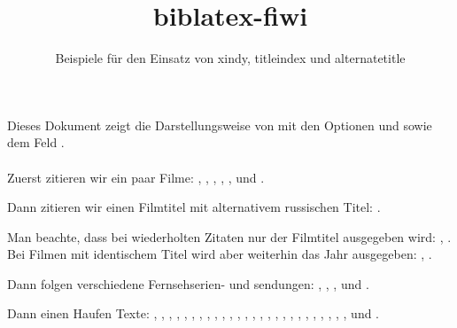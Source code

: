 \documentclass[a4paper]{scrartcl}
\begin{document}
\title{biblatex-fiwi}\subtitle{Beispiele für den Einsatz von xindy, titleindex und alternatetitle}\date{}\maketitle
\noindent Dieses Dokument zeigt die Darstellungsweise von  mit den Optionen  und  sowie dem Feld .\\ \\

\noindent Zuerst zitieren wir ein paar Filme: , , , , ,  und .

Dann zitieren wir einen Filmtitel mit alternativem russischen Titel: .

Man beachte, dass bei wiederholten Zitaten nur der Filmtitel ausgegeben wird: , . Bei Filmen mit identischem Titel wird aber weiterhin das Jahr ausgegeben: , .

Dann folgen verschiedene Fernsehserien- und sendungen: , , ,  und .

Dann einen Haufen Texte: \textcite{sklovskij.v:1969a} \textcite{Spiegel.S:2010c}, \textcite{Muller.A:2010a}, \textcite{Wells.H:1908}, \textcite{Spiegel.S:2007b}, \textcite{Lukian.1981}, \textcite{Kepler.J:1993}, , \textcite{vonMatt.P:2002}, \textcite{Keitz.U:2004a}, \textcite{Wells.HG:1980}, \textcite{Ackerman.Strickland:1981}, \textcite{Anderson.P:1971a}, \textcite{Gaudreault.A:1993}, \textcite{Poe.E:1982c}, \textcite{Poe.E:1999a}, \textcite{Parrinder.P:1980}, \textcite{Wells.H:1980*2}, \textcite{James.H:2004a}, \textcite{James.H:2007a}, \textcite{Hedeler.W:2005a}, \textcite{Ballhausen.T:2009a}, \textcite{Zymner.R:2003a}, \textcite{Zymner.R:2011a}, \textcite{Nelmes.J:2011b}, \textcite{Kuhn.A:1990*2,Blish.J:1973a,Dureau.Y:2005a}, \textcite{Todorov.T:1992}, \textcite{Bordwell.D:2004a} und \textcite{Kirchner.A:2008a}.


\printbibliography[nottype=movie]
\newrefcontext[sorting=title]
\printbibliography[type=movie,heading=film]
\printindex
\end{document}
